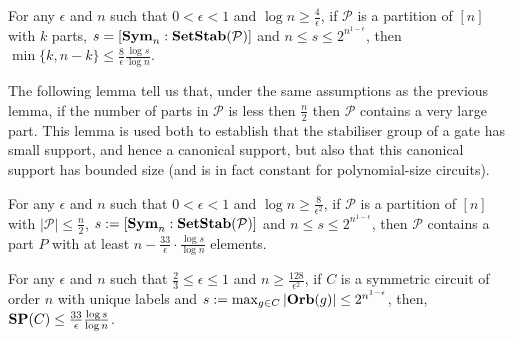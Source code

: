 \documentclass[../paper.tex]{subfiles}
\begin{document}
\begin{lem}
  \label{lem:big-or-small}
  For any $\epsilon$ and $n$ such that $0 < \epsilon < 1$ and $\log n \geq
  \frac{4}{\epsilon}$, if $\mathcal{P}$ is a partition of $[n]$ with $k$ parts,
  $s = [\text{\textbf{Sym}}_n : \text{\textbf{SetStab}} (\mathcal{P})]$ and $n \leq s \leq
  2^{n^{1-\epsilon}}$, then $\min \{k, n-k\} \leq \frac{8}{\epsilon} \frac{\log
    s}{\log n}$.
\end{lem}

The following lemma tell us that, under the same assumptions as the previous
lemma, if the number of parts in $\mathcal{P}$ is less then $\frac{n}{2}$ then
$\mathcal{P}$ contains a very large part. This lemma is used both to establish
that the stabiliser group of a gate has small support, and hence a canonical
support, but also that this canonical support has bounded size (and is in fact
constant for polynomial-size circuits).

\begin{lem}
  \label{lem:small-means-support}
  For any $\epsilon$ and $n$ such that $0 < \epsilon < 1$ and $\log n \geq
  \frac{8}{\epsilon^2}$, if $\mathcal{P}$ is a partition of $[n]$ with $\vert
  \mathcal{P} \vert \leq \frac{n}{2}$, $s:= [\text{\textbf{Sym}}_n : \text{\textbf{SetStab}} (\mathcal{P})]$
  and $n \leq s \leq 2^{n^{1-\epsilon}}$, then $\mathcal{P}$ contains a part $P$
  with at least $n - \frac{33}{\epsilon} \cdot \frac{\log s} {\log n}$ elements.
\end{lem}


\begin{thm}
  \label{thm:support_thm}
  For any $\epsilon$ and $n$ such that $\frac{2}{3} \leq \epsilon \leq 1$ and $n
  \geq \frac{128}{\epsilon^2}$, if $C$ is a symmetric circuit of order $n$ with
  unique labels and $s := \max_{g \in C} \vert \text{\textbf{Orb}} (g)\vert \leq
  2^{n^{1-\epsilon}}$, then, $\text{\textbf{SP}}(C) \leq \frac{33}{\epsilon}\frac{\log s}{\log
    n}$.
\end{thm}
\end{document}
